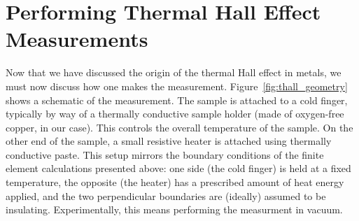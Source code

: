 \documentclass{thesis-umich}
\begin{document}
\section{Performing Thermal Hall Effect Measurements}
Now that we have discussed the origin of the thermal Hall effect in metals, we
must now discuss how one makes the measurement. Figure~\ref{fig:thall_geometry}
shows a schematic of the measurement. The sample is attached to a cold finger,
typically by way of a thermally conductive sample holder (made of oxygen-free
copper, in our case). This controls the overall temperature of the sample. On the other end of the sample, a small resistive heater is attached using thermally conductive paste. This setup mirrors the boundary conditions of the finite element calculations presented above: one side (the cold finger) is held at a fixed temperature, the opposite (the heater) has a prescribed amount of heat energy applied, and the two perpendicular boundaries are (ideally) assumed to be insulating. Experimentally, this means performing the measurment in vacuum.
\end{document}
